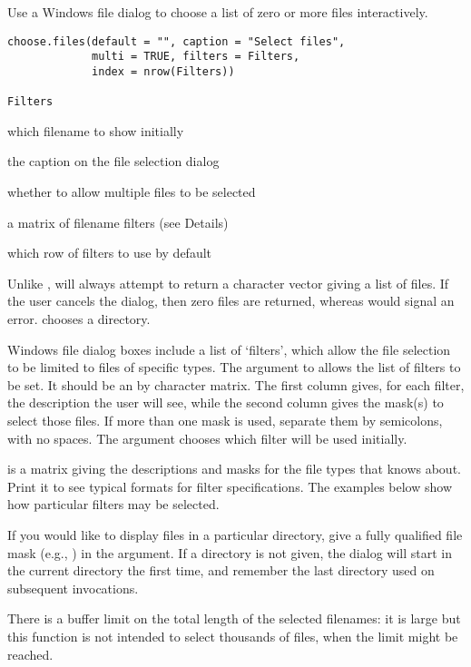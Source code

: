 %
\begin{Description}\relax
Use a Windows file dialog to choose a list of zero or more files 
interactively.
\end{Description}
%
\begin{Usage}
\begin{verbatim}
choose.files(default = "", caption = "Select files",
             multi = TRUE, filters = Filters,
             index = nrow(Filters))

Filters
\end{verbatim}
\end{Usage}
%
\begin{Arguments}
\begin{ldescription}
\item[\code{default}] which filename to show initially
\item[\code{caption}] the caption on the file selection dialog
\item[\code{multi}] whether to allow multiple files to be selected
\item[\code{filters}] a matrix of filename filters (see Details)
\item[\code{index}] which row of filters to use by default
\end{ldescription}
\end{Arguments}
%
\begin{Details}\relax
Unlike ,  will always
attempt to return a character vector giving a list of files.  If the
user cancels the dialog, then zero files are returned, whereas
 would signal an error.  
chooses a directory.

Windows file dialog boxes include a list of `filters', which allow
the file selection to be limited to files of specific types.
The  argument to  allows the list
of filters to be set.  It should be an  by  character
matrix.  The first column gives, for each filter, the description the
user will see, while the second column gives the mask(s) to select
those files.  If more than one mask is used, separate them by
semicolons, with no spaces.  The  argument chooses which
filter will be used initially.

 is a matrix giving the descriptions and masks for
the file types that \R{} knows about.  Print it to see typical formats
for filter specifications.  The examples below show how particular
filters may be selected.

If you would like to display files in a particular directory,
give a fully qualified file mask (e.g., )
in the  argument.  If a directory is not given, the
dialog will start in the current directory the first time, and
remember the last directory used on subsequent invocations.

There is a buffer limit on the total length of the selected filenames:
it is large but this function is not intended to select thousands of
files, when the limit might be reached.
\end{Details}
